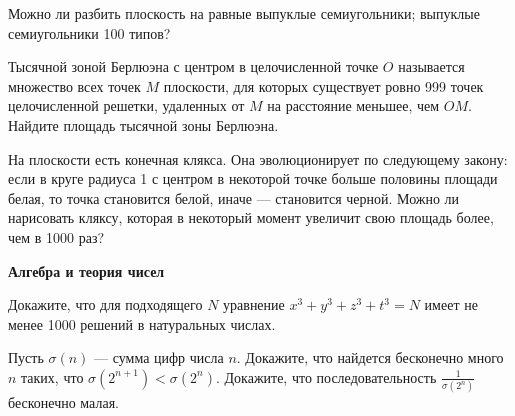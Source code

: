 \documentclass[a4paper,12pt]{article}
\begin{document}
 Можно ли разбить плоскость на  равные выпуклые семиугольники; 
выпуклые семиугольники 100 типов?

 Тысячной зоной Берлюэна с центром в
целочисленной точке $O$ называется множество всех точек $M$ плоскости, для
которых существует ровно 999 точек целочисленной решетки, удаленных от $M$
на расстояние меньшее, чем $OM$. Найдите площадь тысячной зоны Берлюэна.


 На плоскости есть конечная клякса. Она эволюционирует
по следующему закону:  если в круге радиуса 1 с центром в некоторой точке
больше половины площади белая, то точка становится белой, иначе ---
становится черной. Можно ли нарисовать кляксу, которая в некоторый момент
увеличит свою площадь более, чем в 1000 раз?

\begin{center}
{\bf Алгебра и теория чисел}
\end{center}

 Докажите, что для подходящего $N$ уравнение $x^3+y^3+z^3+t^3=N$
имеет не менее 1000 решений в натуральных числах.



 Пусть $\sigma(n)$ --- сумма цифр числа $n$.
 Докажите, что найдется бесконечно много $n$ таких, что
$\sigma(2^{n+1})<\sigma(2^n)$.
 Докажите, что последовательность $\displaystyle\frac1{\sigma(2^n)}$ бесконечно малая.


\end{document}
